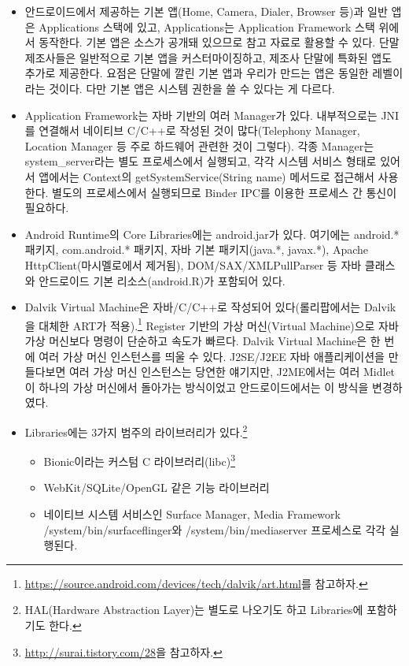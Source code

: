 \begin{itemize}
\item 안드로이드에서 제공하는 기본 앱(Home, Camera, Dialer, Browser 등)과 일반 앱은 Applications 스택에 있고, Applications는 Application Framework 스택 위에서 동작한다. 기본 앱은 소스가 공개돼 있으므로 참고 자료로 활용할 수 있다. 단말 제조사들은 일반적으로 기본 앱을 커스터마이징하고, 제조사 단말에 특화된 앱도 추가로 제공한다. 요점은 단말에 깔린 기본 앱과 우리가 만드는 앱은 동일한 레벨이라는 것이다. 다만 기본 앱은 시스템 권한을 쓸 수 있다는 게 다르다.

\item Application Framework는 자바 기반의 여러 Manager가 있다. 내부적으로는 JNI를 연결해서 네이티브 C/C++로 작성된 것이 많다(Telephony Manager, Location Manager 등 주로 하드웨어 관련한 것이 그렇다). 각종 Manager는 system\_server라는 별도 프로세스에서 실행되고, 각각 시스템 서비스 형태로 있어서 앱에서는 Context의 getSystemService(String name) 메서드로 접근해서 사용한다. 별도의 프로세스에서 실행되므로 Binder IPC를 이용한 프로세스 간 통신이 필요하다.

\item Android Runtime의 Core Libraries에는 android.jar가 있다. 여기에는 android.* 패키지, com.android.* 패키지, 자바 기본 패키지(java.*, javax.*), Apache HttpClient(마시멜로에서 제거됨), DOM/SAX/XM\-LPullParser 등 자바 클래스와 안드로이드 기본 리소스(android.R)가 포함되어 있다.

\item Dalvik Virtual Machine은 자바/C/C++로 작성되어 있다(롤리팝에서는 Dalvik을 대체한 ART가 적용).\footnote{\url{https://source.android.com/devices/tech/dalvik/art.html}를 참고하자.} Register 기반의 가상 머신(Virtual Machine)으로 자바 가상 머신보다 명령이 단순하고 속도가 빠르다.
Dalvik Virtual Machine은 한 번에 여러 가상 머신 인스턴스를 띄울 수 있다. J2SE/J2EE 자바 애플리케이션을 만들다보면 여러 가상 머신 인스턴스는 당연한 얘기지만, J2ME에서는 여러 Midlet이 하나의 가상 머신에서 돌아가는 방식이었고 안드로이드에서는 이 방식을 변경하였다.

\item Libraries에는 3가지 범주의 라이브러리가 있다.\footnote{HAL(Hardware Abstraction Layer)는 별도로 나오기도 하고 Libraries에 포함하기도 한다.}
\begin{itemize}
\item Bionic이라는 커스텀 C 라이브러리(libc)\footnote{\url{http://surai.tistory.com/28}을 참고하자.}
\item WebKit/SQLite/OpenGL 같은 기능 라이브러리
\item 네이티브 시스템 서비스인 Surface Manager, Media Framework\\
/system/bin/surfaceflinger와 /system/bin/mediaserver 프로세스로 각각 실행된다.
\end{itemize}


\end{itemize}
